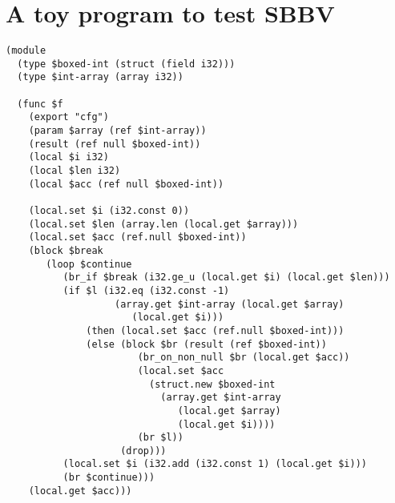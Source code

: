 \documentclass[a4paper,11pt]{article}
\begin{document}
\section{A toy program to test SBBV}\label{toy}
\begin{lstlisting}
(module
  (type $boxed-int (struct (field i32)))
  (type $int-array (array i32))

  (func $f
    (export "cfg")
    (param $array (ref $int-array))
    (result (ref null $boxed-int))
    (local $i i32)
    (local $len i32)
    (local $acc (ref null $boxed-int))

    (local.set $i (i32.const 0))
    (local.set $len (array.len (local.get $array)))
    (local.set $acc (ref.null $boxed-int))
    (block $break
       (loop $continue
          (br_if $break (i32.ge_u (local.get $i) (local.get $len)))
          (if $l (i32.eq (i32.const -1)
                   (array.get $int-array (local.get $array)
                      (local.get $i)))
              (then (local.set $acc (ref.null $boxed-int)))
              (else (block $br (result (ref $boxed-int))
                       (br_on_non_null $br (local.get $acc))
                       (local.set $acc
                         (struct.new $boxed-int
                           (array.get $int-array
                              (local.get $array)
                              (local.get $i))))
                       (br $l))
                    (drop)))
          (local.set $i (i32.add (i32.const 1) (local.get $i)))
          (br $continue)))
    (local.get $acc)))
\end{lstlisting}
\end{document}
